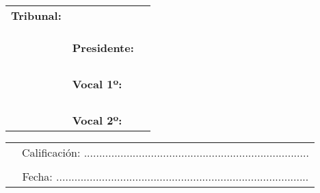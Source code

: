 \vspace{1cm}
\begin{center}
  \begin{tabular}{rll}
    \textbf{Tribunal:} & &\\ \\ \\
    &&\\
    & \textbf{Presidente:} \\ \\ \\
    \\
    &&\\
    & \textbf{Vocal 1º:}& \\ \\ \\
    \\
    &&\\
    & \textbf{Vocal 2º:}&
  \end{tabular}
\end{center}


\vspace{15mm}
\begin{tabular}{p{3cm}c}
  &Calificación: ..........................................................................\\ \\
  &Fecha: ...................................................................................
\end{tabular}

\normalsize

